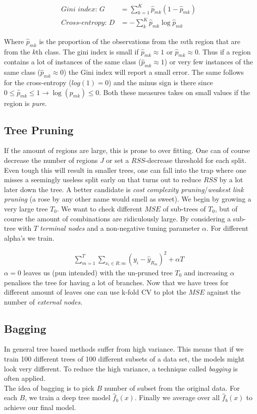 \documentclass{article}
\begin{document}
\begin{align*}
\textit{Gini index: } G &= \sum_{k = 1}^{K} \hat{p}_{mk} (1-\hat{p}_{mk}) \\
\textit{Cross-entropy: } D &= -\sum_{k}^{K} \hat{p}_{mk} \log{\hat{p}_{mk}}
\end{align*}

Where $\hat{p}_{mk}$ is the proportion of the observations from the $m$th region that are from the $k$th class. The gini index is small if $\hat{p}_{mk} \approx 1$ or $\hat{p}_{mk} \approx 0$. Thus if a region contains a lot of instances of the same class ($\hat{p}_{mk} \approx 1$) or very few instances of the same class ($\hat{p}_{mk} \approx 0$) the Gini index will report a small error. The same follows for the cross-entropy ($log(1) = 0$) and the minus sign is there since $0 \leq \hat{p}_{mk} \leq 1 \rightarrow \log(\hat{p}_{mk}) \leq 0$. Both these measures takes on small values if the region is \textit{pure}.  

\subsection{Tree Pruning}
If the amount of regions are large, this is prone to over fitting. One can of course decrease the number of regions $J$ or set a $RSS$-decrease threshold for each split. Even tough this will result in smaller trees, one can fall into the trap where one misses a seemingly useless split early on that turns out to reduce $RSS$ by a lot later down the tree. A better candidate is \textit{cost complexity pruning}/\textit{weakest link pruning} (a rose by any other name would smell as sweet). We begin by growing a very large tree $T_0$. We want to check different $MSE$ of sub-trees of $T_0$, but of course the amount of combinations are ridiculously large. By considering a sub-tree with $T$ \textit{terminal nodes} and a non-negative tuning parameter $\alpha$. For different alpha's we train.

\begin{align*}
    \sum_{m=1}^{T}\sum_{x_i \in R:m} (y_i - \hat{y}_{R_m})^2 + \alpha T
\end{align*}
$\alpha = 0$ leaves us (pun intended) with the un-pruned tree $T_0$ and increasing $\alpha$ penalises the tree for having a lot of branches. Now that we have trees for different amount of leaves one can use k-fold CV to plot the $MSE$ against the number of \textit{external nodes}.

\subsection{Bagging}
In general tree based methods suffer from high variance. This means that if we train 100 different trees of 100 different subsets of a data set, the models might look very different. To reduce the high variance, a technique called \textit{bagging} is often applied.
\\
The idea of bagging is to pick $B$ number of subset from the original data. For each $B$, we train a deep tree model $\hat{f}_b(x)$. Finally we average over all $\hat{f}_b(x)$ to achieve our final model.
\end{document}

